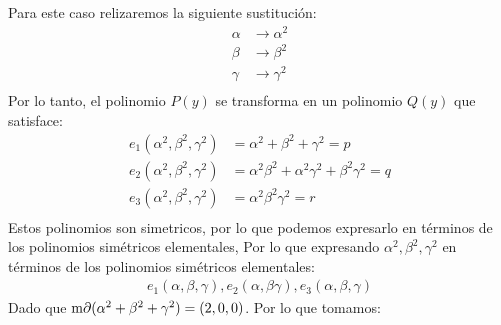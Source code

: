 \begin{solucion}
  \item Para este caso relizaremos la siguiente sustitución:
  \begin{align*}
    \alpha &\to \alpha^2\\
    \beta &\to \beta^2\\
    \gamma &\to \gamma^2\\
  \end{align*}
  Por lo tanto, el polinomio $P(y)$ se transforma en un polinomio $Q(y)$ que satisface:
  \begin{align*}
    e_1(\alpha^2, \beta^2, \gamma^2) &= \alpha^2 + \beta^2 + \gamma^2 = p\\
    e_2(\alpha^2, \beta^2, \gamma^2) &= \alpha^2\beta^2 + \alpha^2\gamma^2 + \beta^2\gamma^2 = q\\
    e_3(\alpha^2, \beta^2, \gamma^2) &= \alpha^2\beta^2\gamma^2 = r\\
  \end{align*}
  Estos polinomios son simetricos, por lo que podemos expresarlo en términos de los polinomios simétricos elementales,
  Por lo que expresando $\alpha^2, \beta^2, \gamma^2$ en términos de los polinomios simétricos elementales:
  \begin{align*}
    e_1(\alpha,\beta,\gamma), e_2(\alpha,\beta\gamma),e_3(\alpha,\beta,\gamma)
  \end{align*}
  Dado que $\operatorname{m\partial}(\alpha^2 + \beta^2 + \gamma^2) = (2,0,0)$. Por lo que tomamos:


\end{solucion}
